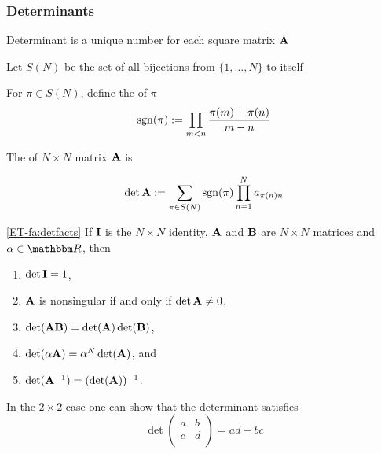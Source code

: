 \begin{frame}\frametitle{Determinants}

    \vspace{.7em}
    Determinant is a unique number for each square matrix $\mathbf A$
    
    Let $S(N)$ be
    the set of all bijections from $\{1, \ldots, N\}$ to itself
    
    \vspace{.7em}
    For $\pi \in S(N)$, define the  of $\pi$ 
    \begin{equation*}
        \operatorname{sgn}(\pi) := \prod_{m < n} \frac{\pi(m) - \pi(n)}{m - n}
    \end{equation*}
    
    \vspace{1em}
    The  of $N \times N$ matrix $\mathbf A$ is
    
    \begin{equation*}
        \det \mathbf A 
        := \sum_{\pi \in S(N)} \operatorname{sgn}(\pi) \prod_{n=1}^N a_{\pi(n) n}
    \end{equation*}
    
\end{frame}

\begin{frame}

    \vspace{.7em}
    \Fact
    \eqref{ET-fa:detfacts}
    If $\mathbf I$ is the $N \times N$ identity, $\mathbf A$ and $\mathbf B$ are $N
    \times N$ matrices and $\alpha \in \RR$, then
    \begin{enumerate}
        \item $\det \mathbf I = 1$,
        \item $\mathbf A$ is nonsingular if and only if $\det \mathbf A
            \not= 0$,
        \item $\det(\mathbf A\mathbf B) = \det(\mathbf A)
            \det(\mathbf B)$,
        \item $\det(\alpha \mathbf A) = \alpha^N \det(\mathbf A)$, and
        \item $\det(\mathbf A^{-1}) = (\det(\mathbf A))^{-1}$.
    \end{enumerate}
    
    \vspace{.7em}
    In the $2 \times 2$ case one can show that the determinant satisfies
    \begin{equation*}
        \label{eq:det22}
        \det 
        \left(
        \begin{array}{cc}
            a & b  \\
            c & d  \\
        \end{array}
        \right)
        = ad - bc
    \end{equation*}
    
\end{frame}


